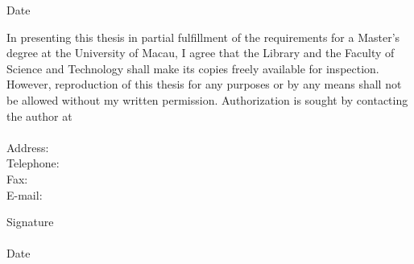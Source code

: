 \begin{titlepage}
  Date \hrulefill %
\end{titlepage}

\newpage
\thispagestyle{empty}
\noindent In presenting this thesis in partial fulfillment of the requirements for a Master's degree at the University of Macau, I agree that the Library and the Faculty of Science and Technology shall make its copies freely available for inspection. However, reproduction of this thesis for any purposes or by any means shall not be allowed without my written permission. Authorization is sought by contacting the author at\\
\hphantom{invisible line}\\
\hphantom{indent}Address:\\
\hphantom{indent}Telephone:\\
\hphantom{indent}Fax:\\
\hphantom{indent}E-mail:\\
\hphantom{invisible line}
\hphantom{invisible line}
\begin{flushright}
  \begin{minipage}[position]{0.5\textwidth}
    Signature \hrulefill\\ %
    \hphantom{invisible line}\\
    Date \hrulefill %
  \end{minipage}
\end{flushright}